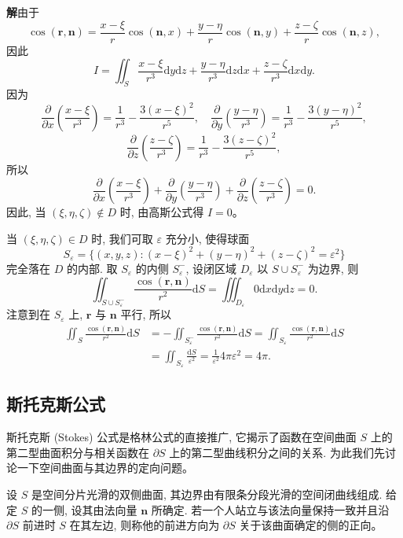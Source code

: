 \documentclass[UTF8,12pt,a4paper,fontset=fandol]{ctexart}
\begin{document}
\noindent\textbf{解}\quad 由于
\[
  \cos(\boldsymbol r,\boldsymbol n)
  =\frac{x-\xi}{r}\cos(\boldsymbol n,x)
   +\frac{y-\eta}{r}\cos(\boldsymbol n,y)
   +\frac{z-\zeta}{r}\cos(\boldsymbol n,z),
\]
因此
\[
  I=\iint_S\frac{x-\xi}{r^3}\mathrm dy\mathrm dz
    +\frac{y-\eta}{r^3}\mathrm dz\mathrm dx
    +\frac{z-\zeta}{r^3}\mathrm dx\mathrm dy.
\]
因为
\[
  \frac{\partial}{\partial x}\left(\frac{x-\xi}{r^3}\right)=\frac1{r^3}-\frac{3(x-\xi)^2}{r^5},\quad
  \frac{\partial}{\partial y}\left(\frac{y-\eta}{r^3}\right)=\frac1{r^3}-\frac{3(y-\eta)^2}{r^5},
\]
\[
  \frac{\partial}{\partial z}\left(\frac{z-\zeta}{r^3}\right)=\frac1{r^3}-\frac{3(z-\zeta)^2}{r^5},
\]
所以
\[
  \frac{\partial}{\partial x}\left(\frac{x-\xi}{r^3}\right)
  +\frac{\partial}{\partial y}\left(\frac{y-\eta}{r^3}\right)
  +\frac{\partial}{\partial z}\left(\frac{z-\zeta}{r^3}\right)=0.
\]
因此, 当 $(\xi,\eta,\zeta)\notin D$ 时, 由高斯公式得 $I=0$。

当 $(\xi,\eta,\zeta)\in D$ 时, 我们可取 $\varepsilon$ 充分小, 使得球面
\[
  S_\varepsilon=\{(x,y,z):(x-\xi)^2+(y-\eta)^2+(z-\zeta)^2=\varepsilon^2\}
\]
完全落在 $D$ 的内部. 取 $S_\varepsilon$ 的内侧 $S_\varepsilon^-$, 设闭区域 $D_\varepsilon$ 以 $S\cup S_\varepsilon^-$ 为边界, 则
\[
  \iint_{S\cup S_\varepsilon^-}\frac{\cos(\boldsymbol r,\boldsymbol n)}{r^2}\mathrm dS
  =\iiint_{D_\varepsilon}0\mathrm dx\mathrm dy\mathrm dz=0.
\]
注意到在 $S_\varepsilon$ 上, $\boldsymbol r$ 与 $\boldsymbol n$ 平行, 所以
\[
\begin{aligned}
  \iint_S\frac{\cos(\boldsymbol r,\boldsymbol n)}{r^2}\mathrm dS
  &=-\iint_{S_\varepsilon^-}\frac{\cos(\boldsymbol r,\boldsymbol n)}{r^2}\mathrm dS
    =\iint_{S_\varepsilon}\frac{\cos(\boldsymbol r,\boldsymbol n)}{r^2}\mathrm dS\\
  &=\iint_{S_\varepsilon}\frac{\mathrm dS}{\varepsilon^2}
    =\frac1{\varepsilon^2}4\pi\varepsilon^2=4\pi.
\end{aligned}
\]

\subsection{斯托克斯公式}

斯托克斯 (Stokes) 公式是格林公式的直接推广, 它揭示了函数在空间曲面 $S$ 上的第二型曲面积分与相关函数在 $\partial S$ 上的第二型曲线积分之间的关系. 为此我们先讨论一下空间曲面与其边界的定向问题。

设 $S$ 是空间分片光滑的双侧曲面, 其边界由有限条分段光滑的空间闭曲线组成. 给定 $S$ 的一侧, 设其由法向量 $\boldsymbol n$ 所确定. 若一个人站立与该法向量保持一致并且沿 $\partial S$ 前进时 $S$ 在其左边, 则称他的前进方向为 $\partial S$ 关于该曲面确定的侧的正向。
\end{document}
